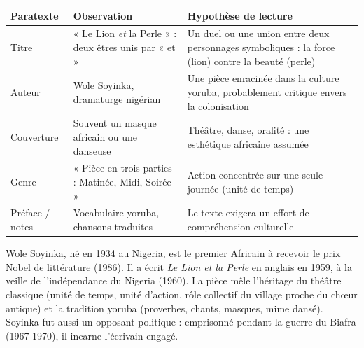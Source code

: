 \documentclass[11pt]{article}
\begin{document}
\begin{center}
\begin{tabularx}{\linewidth}{|l|X|X|}
\hline
\rowcolor{popblueL} \textbf{Paratexte} & \textbf{Observation} & \textbf{Hypothèse de lecture} \\
\hline
Titre & « Le Lion \emph{et} la Perle » : deux êtres unis par « et » & Un duel ou une union entre deux personnages symboliques : la force (lion) contre la beauté (perle) \\
\hline
Auteur & Wole Soyinka, dramaturge nigérian & Une pièce enracinée dans la culture yoruba, probablement critique envers la colonisation \\
\hline
Couverture & Souvent un masque africain ou une danseuse & Théâtre, danse, oralité : une esthétique africaine assumée \\
\hline
Genre & « Pièce en trois parties : Matinée, Midi, Soirée » & Action concentrée sur une seule journée (unité de temps) \\
\hline
Préface / notes & Vocabulaire yoruba, chansons traduites & Le texte exigera un effort de compréhension culturelle \\
\hline
\end{tabularx}
\end{center}

\begin{savaistu}
Wole Soyinka, né en 1934 au Nigeria, est le premier Africain à recevoir le prix Nobel de littérature (1986). Il a écrit \emph{Le Lion et la Perle} en anglais en 1959, à la veille de l'indépendance du Nigeria (1960). La pièce mêle l'héritage du théâtre classique (unité de temps, unité d'action, rôle collectif du village proche du chœur antique) et la tradition yoruba (proverbes, chants, masques, mime dansé). Soyinka fut aussi un opposant politique : emprisonné pendant la guerre du Biafra (1967-1970), il incarne l'écrivain engagé.
\end{savaistu}
\end{document}
